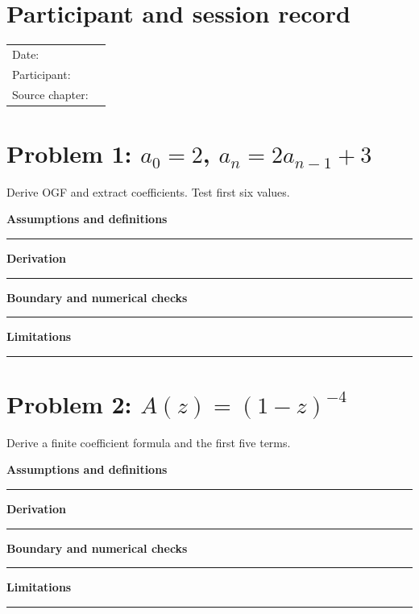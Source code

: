 \documentclass[11pt]{article}
\begin{document}
\makedoctitle
\section{Participant and session record}
\begin{tabularx}{\linewidth}{@{}lX@{}}Date: & \hrulefill\\ Participant: & \hrulefill\\ Source chapter: & \hrulefill\\\end{tabularx}
\section{\texorpdfstring{Problem 1: $a_0=2$, $a_n=2a_{n-1}+3$}{Problem 1: First-order affine recurrence}}
Derive OGF and extract coefficients. Test first six values.\par\medskip
\textbf{Assumptions and definitions}\par\vspace{0.7cm}\hrule\vspace{0.35cm}
\textbf{Derivation}\par\vspace{2.1cm}\hrule\vspace{0.3cm}
\textbf{Boundary and numerical checks}\par\vspace{1.1cm}\hrule\vspace{0.35cm}
\textbf{Limitations}\par\vspace{0.9cm}\hrule\vspace{0.35cm}
\section{\texorpdfstring{Problem 2: $A(z)=(1-z)^{-4}$}{Problem 2: Generating function with a fourth-order pole}}
Derive a finite coefficient formula and the first five terms.\par\medskip
\textbf{Assumptions and definitions}\par\vspace{0.7cm}\hrule\vspace{0.35cm}
\textbf{Derivation}\par\vspace{2.1cm}\hrule\vspace{0.3cm}
\textbf{Boundary and numerical checks}\par\vspace{1.1cm}\hrule\vspace{0.35cm}
\textbf{Limitations}\par\vspace{0.9cm}\hrule\vspace{0.35cm}
\end{document}
